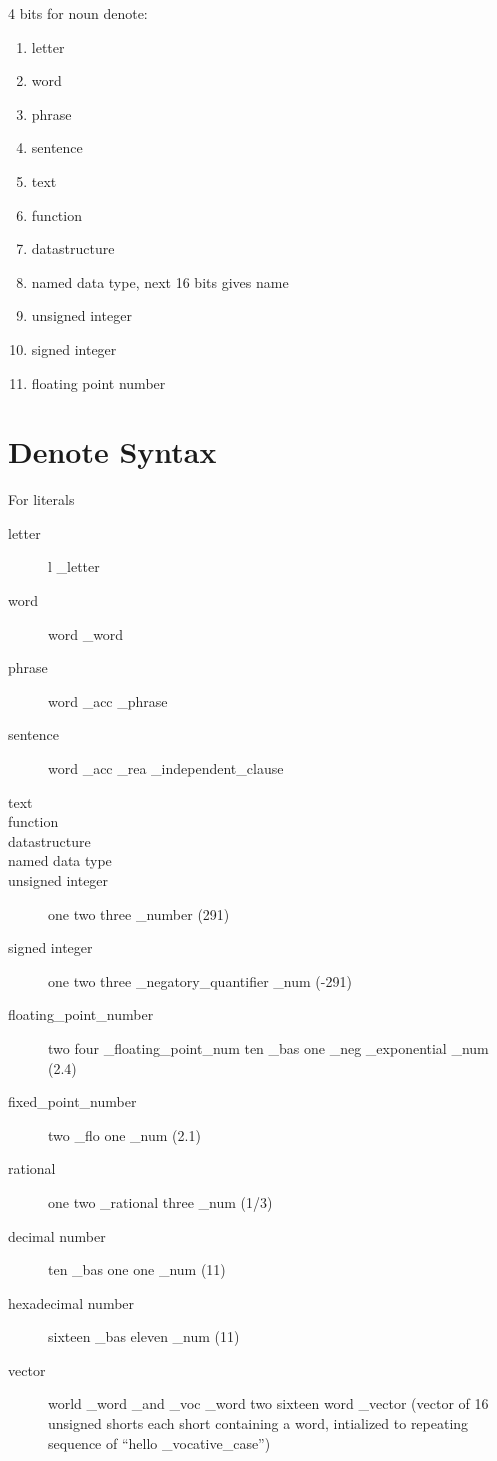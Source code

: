 \documentclass[12pt]{report}
\begin{document}
4 bits for noun denote:
\begin{enumerate}
  \setcounter{enumi}{0}
  \item letter
  \item word
  \item phrase
  \item sentence
  \item text
  \item function
  \item datastructure
  \item named data type, next 16 bits gives name
  \item unsigned integer
  \item signed integer
  \item floating point number
\end{enumerate}
\section{Denote Syntax}
For literals
\begin{description}
  \item[letter] l \_letter
  \item[word] word \_word
  \item[phrase] word \_acc \_phrase
  \item[sentence] word \_acc \_rea \_independent\_clause
  \item[text] 
  \item[function]
  \item[datastructure]
  \item[named data type]
  \item[unsigned integer] one two three \_number (291)
  \item[signed integer] one two three \_negatory\_quantifier \_num
(-291)
  \item[floating\_point\_number] two four \_floating\_point\_num ten \_bas
one \_neg \_exponential \_num (2.4)
  \item[fixed\_point\_number] two \_flo one \_num (2.1)
  \item[rational] one two \_rational three \_num (1/3)
  \item[decimal number] ten \_bas  one one \_num (11)
  \item[hexadecimal number] sixteen \_bas eleven \_num (11)
  \item[vector] world \_word \_and \_voc \_word two sixteen word \_vector (vector of 16
unsigned shorts each short containing a word, intialized to repeating sequence
of ``hello \_vocative\_case'')
\end{description}
\end{document}
